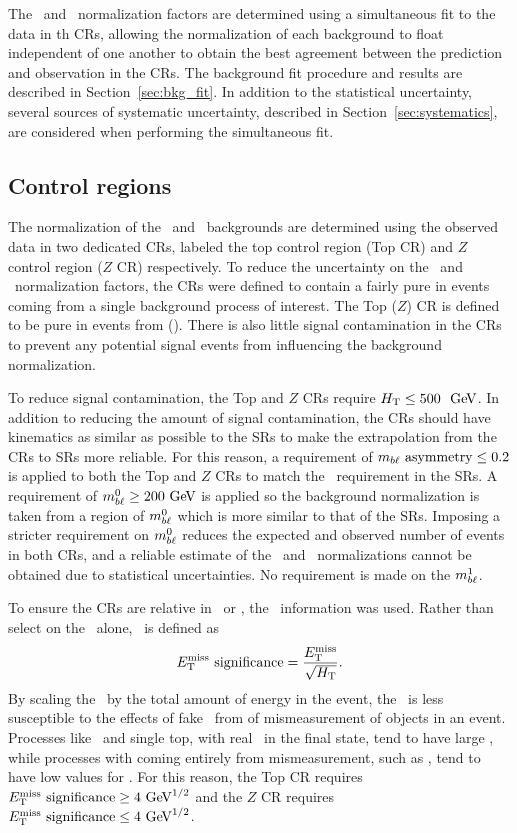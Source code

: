 The \TTBAR\ and \ZGAMMAJETS\ normalization factors are determined using a
simultaneous fit to the data in th CRs, allowing the normalization of each
background to float independent of one another to obtain the best agreement
between the prediction and observation in the CRs.
The background fit procedure and results are described in
Section~\ref{sec:bkg_fit}.
In addition to the statistical uncertainty, several sources of systematic
uncertainty, described in Section~\ref{sec:systematics}, are considered when
performing the simultaneous fit.

\subsection{Control regions}
\label{sec:cr}

The normalization of the \TTBAR\ and \ZGAMMAJETS\ backgrounds are determined
using the observed data in two dedicated CRs, labeled the top control region
(Top CR) and $Z$ control region ($Z$ CR) respectively.
To reduce the uncertainty on the \TTBAR\ and \ZGAMMAJETS\ normalization factors,
the CRs were defined to contain a fairly pure in events coming from a single
background process of interest.
The Top ($Z$) CR is defined to be pure in events from \TTBAR (\ZGAMMAJETS).
There is also little signal contamination in the CRs to prevent any potential
signal events from influencing the background normalization.

To reduce signal contamination, the Top and $Z$ CRs require $\HT \leq 500~\GeV$.
In addition to reducing the amount of signal contamination, the CRs should have
kinematics as similar as possible to the SRs to make the extrapolation from the
CRs to SRs more reliable.
For this reason, a requirement of $m_{b\ell}~\mathrm{asymmetry} \leq 0.2$ is applied to both the
Top and $Z$ CRs to match the \MBLASYM\ requirement in the SRs.
A requirement of $\MBL^0 \geq 200 \GeV$ is applied so the background
normalization is taken from a region of $m_{b\ell}^0$ which is more similar to that
of the SRs.
Imposing a stricter requirement on $m_{b\ell}^0$ reduces the expected and observed
number of events in both CRs, and a reliable estimate of the \TTBAR\ and
\ZGAMMAJETS\ normalizations cannot be obtained due to statistical uncertainties.
No requirement is made on the $m_{b\ell}^1$.

To ensure the CRs are relative in \TTBAR\ or \ZGAMMAJETS, the \MET\ information
was used.
Rather than select on the \MET\ alone, \METSIG\ is defined as
\begin{equation}
  E_{\mathrm{T}}^{\mathrm{miss}}~\text{significance} = \frac{E_{\mathrm{T}}^{\mathrm{miss}}}{\sqrt{H_{\mathrm{T}}}}.
\end{equation}
By scaling the \MET\ by the total amount of energy in the event, the
\METSIG\ is less susceptible to the effects of fake \MET\ from of mismeasurement
of objects in an event.
Processes like \TTBAR\ and single top, with real \MET\ in the final state, tend
to have large \METSIG, while processes with \MET coming entirely from
mismeasurement, such as \ZGAMMAJETS, tend to have low values for \METSIG.
For this reason, the Top CR requires $\METSIG \geq 4 \GeV^{1/2}$
and the $Z$ CR requires $\METSIG \leq 4 \GeV^{1/2}$.


